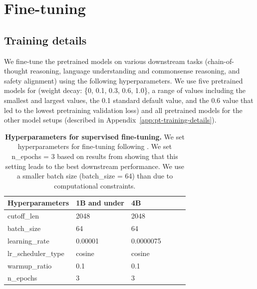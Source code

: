 \section{Fine-tuning}
\label{app:ft}





\subsection{Training details}
\label{app:ft-training-details}

We fine-tune the pretrained models on various downstream tasks (chain-of-thought reasoning, language understanding and commonsense reasoning, and safety alignment) using the following hyperparameters. 
We use five pretrained models for \olmoonex{} (weight decay: \{0, 0.1, 0.3, 0.6, 1.0\}, a range of values including the smallest and largest values, the 0.1 standard default value, and the 0.6 value that led to the lowest pretraining validation loss) and all pretrained models for the other model setups (described in Appendix~\ref{app:pt-training-details}).

\renewcommand{\arraystretch}{1.1} 
\begin{table}[H]
\centering
\begin{tabular}{llllll}
\hline
\textbf{Hyperparameters} & \textbf{1B and under} & \textbf{4B}  \\ 
\hline
cutoff\_len             & 2048       & 2048        \\
batch\_size             & 64        & 64         \\
learning\_rate          & 0.00001    & 0.0000075   \\
lr\_scheduler\_type     & cosine     & cosine      \\
warmup\_ratio           &  0.1       &  0.1        \\
n\_epochs               &  3       &  3        \\
\hline
\end{tabular}
\vspace{0.1cm}
\caption{\textbf{Hyperparameters for supervised fine-tuning.} We set hyperparameters for fine-tuning following \citet{qi2025evolm}. We set n\_epochs = 3 based on results from \citet{qi2025evolm} showing that this setting leads to the best downstream performance. We use a smaller batch size (batch\_size = 64) than \citet{qi2025evolm} due to computational constraints.}
\label{table:ft-training}
\end{table}


